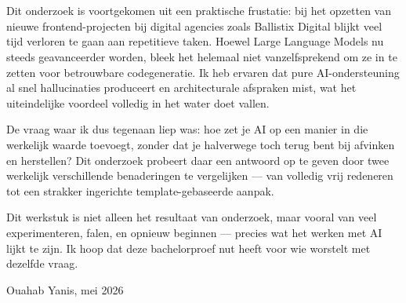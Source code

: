 
\chapter*{}%
\label{ch:voorwoord}

Dit onderzoek is voortgekomen uit een praktische frustatie: bij het opzetten van nieuwe frontend-projecten bij digital agencies zoals Ballistix Digital blijkt veel tijd verloren te gaan aan repetitieve taken. Hoewel Large Language Models nu steeds geavanceerder worden, bleek het helemaal niet vanzelfsprekend om ze in te zetten voor betrouwbare codegeneratie. Ik heb ervaren dat pure AI-ondersteuning al snel hallucinaties produceert en architecturale afspraken mist, wat het uiteindelijke voordeel volledig in het water doet vallen.

De vraag waar ik dus tegenaan liep was: hoe zet je AI op een manier in die werkelijk waarde toevoegt, zonder dat je halverwege toch terug bent bij afvinken en herstellen? Dit onderzoek probeert daar een antwoord op te geven door twee werkelijk verschillende benaderingen te vergelijken --- van volledig vrij redeneren tot een strakker ingerichte template-gebaseerde aanpak.

Dit werkstuk is niet alleen het resultaat van onderzoek, maar vooral van veel experimenteren, falen, en opnieuw beginnen --- precies wat het werken met AI lijkt te zijn. Ik hoop dat deze bachelorproef nut heeft voor wie worstelt met dezelfde vraag.

\vspace{\baselineskip}

Ouahab Yanis, mei 2026